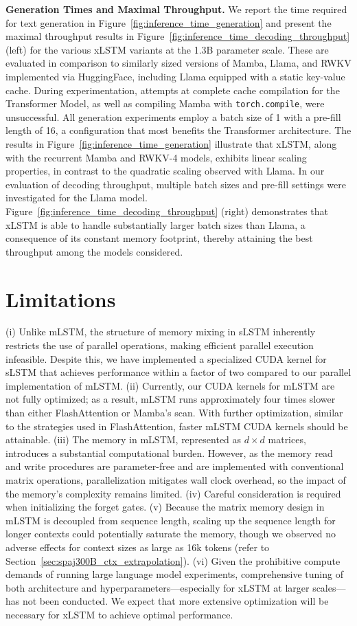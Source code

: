 \textbf{Generation Times and Maximal Throughput.} We report the time required for text generation in Figure~\ref{fig:inference_time_generation} and present the maximal throughput results in Figure~\ref{fig:inference_time_decoding_throughput} (left) for the various xLSTM variants at the 1.3B parameter scale. These are evaluated in comparison to similarly sized versions of Mamba, Llama, and RWKV implemented via HuggingFace, including Llama equipped with a static key-value cache. During experimentation, attempts at complete cache compilation for the Transformer Model, as well as compiling Mamba with \texttt{torch.compile}, were unsuccessful. All generation experiments employ a batch size of 1 with a pre-fill length of 16, a configuration that most benefits the Transformer architecture. 
The results in Figure~\ref{fig:inference_time_generation} illustrate that xLSTM, along with the recurrent Mamba and RWKV-4 models, exhibits linear scaling properties, in contrast to the quadratic scaling observed with Llama. In our evaluation of decoding throughput, multiple batch sizes and pre-fill settings were investigated for the Llama model.
Figure~\ref{fig:inference_time_decoding_throughput} (right) demonstrates that xLSTM is able to handle substantially larger batch sizes than Llama, a consequence of its constant memory footprint, thereby attaining the best throughput among the models considered.

\section{Limitations}

(i) Unlike mLSTM, the structure of memory mixing in sLSTM inherently restricts the use of parallel operations, making efficient parallel execution infeasible. Despite this, we have implemented a specialized CUDA kernel for sLSTM that achieves performance within a factor of two compared to our parallel implementation of mLSTM. (ii) Currently, our CUDA kernels for mLSTM are not fully optimized; as a result, mLSTM runs approximately four times slower than either FlashAttention or Mamba’s scan. With further optimization, similar to the strategies used in FlashAttention, faster mLSTM CUDA kernels should be attainable. (iii) The memory in mLSTM, represented as $d \times d$ matrices, introduces a substantial computational burden. However, as the memory read and write procedures are parameter-free and are implemented with conventional matrix operations, parallelization mitigates wall clock overhead, so the impact of the memory’s complexity remains limited. (iv) Careful consideration is required when initializing the forget gates. (v) Because the matrix memory design in mLSTM is decoupled from sequence length, scaling up the sequence length for longer contexts could potentially saturate the memory, though we observed no adverse effects for context sizes as large as 16k tokens (refer to Section~\ref{sec:spaj300B_ctx_extrapolation}). (vi) Given the prohibitive compute demands of running large language model experiments, comprehensive tuning of both architecture and hyperparameters—especially for xLSTM at larger scales—has not been conducted. We expect that more extensive optimization will be necessary for xLSTM to achieve optimal performance.

